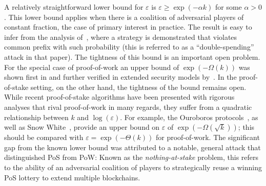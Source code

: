 A relatively straightforward lower bound for $\varepsilon$ is 
$\varepsilon \geq \exp(-\alpha k )$ for some $\alpha>0$.  This lower
bound applies when there is a coalition of adversarial players of
constant fraction,
the case of primary interest in practice. The result is easy to infer
from the analysis of~\cite{Nakamoto2008}, where a strategy is
demonstrated that violates common prefix with such probability (this
is referred to as a ``double-spending'' attack in that paper). The
tightness of this bound is an important open problem. For the special
case of proof-of-work an upper bound of $\exp(-\Omega(k))$ was shown
first in \cite{DBLP:conf/eurocrypt/GarayKL15} and further verified in
extended security models
by~\cite{DBLP:conf/crypto/GarayKL17,DBLP:conf/eurocrypt/PassSS17}.
In the proof-of-stake setting, on the other hand, the tightness of the
bound remains open.  While recent proof-of-stake algorithms have been
presented with rigorous analyses that rival proof-of-work in many
regards, they suffer from a quadratic relationship between $k$ and
$\log(\varepsilon)$. For example, the Ouroboros
protocols~\cite{KRDO17,DBLP:conf/eurocrypt/DavidGKR18,DBLP:journals/iacr/BadertscherGKRZ18},
as well as Snow White~\cite{DBLP:journals/iacr/BentovPS16a}, provide
an upper bound on $\varepsilon$ of $\exp(-\Omega(\sqrt{k}))$; this
should be compared with $\varepsilon = \exp(-\Theta(k))$ for
proof-of-work. The significant gap from the known lower bound was
attributed to a notable, general attack that distinguished PoS from
PoW: Known as the \emph{nothing-at-stake} problem, this refers to the
ability of an adversarial coalition of players to strategically reuse
a winning PoS lottery to extend multiple blockchains.


